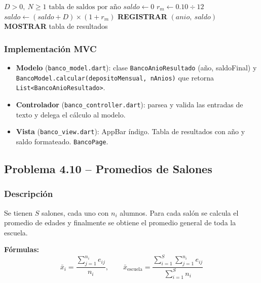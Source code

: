 \documentclass[12pt,a4paper]{article}
\begin{document}
\begin{algorithm}[H]
\caption{Saldo de Cuenta de Ahorros con Capitalización Compuesta Mensual}
\label{alg:banco}
\begin{algorithmic}[1]
  \Require $D > 0,\ N \geq 1$
  \Ensure $\text{tabla de saldos por año}$
  \State $saldo \leftarrow 0$
  \State $r_m \leftarrow 0.10 \div 12$
      \State $saldo \leftarrow (saldo + D) \times (1 + r_m)$
    \EndFor
    \State \textbf{REGISTRAR} $(anio,\ saldo)$
  \EndFor
  \State \textbf{MOSTRAR} tabla de resultados
\end{algorithmic}
\end{algorithm}

\subsubsection{Implementación MVC}

\begin{itemize}
  \item \textbf{Modelo} (\texttt{banco\_model.dart}): clase \texttt{BancoAnioResultado} (año, saldoFinal) y \texttt{BancoModel\allowbreak.calcular\allowbreak(depositoMensual, nAnios)} que retorna \texttt{List<\allowbreak{}BancoAnioResultado>}.
  \item \textbf{Controlador} (\texttt{banco\_controller.dart}): parsea y valida las entradas de texto y delega el cálculo al modelo.
  \item \textbf{Vista} (\texttt{banco\_view.dart}): AppBar índigo. Tabla de resultados con año y saldo formateado. \texttt{BancoPage}.
\end{itemize}

\subsection{Problema 4.10 -- Promedios de Salones}

\subsubsection{Descripción}

Se tienen $S$ salones, cada uno con $n_i$ alumnos. Para cada salón se calcula el promedio de edades y finalmente se obtiene el promedio general de toda la escuela.

\textbf{Fórmulas:}
\[
  \bar{x}_i = \frac{\displaystyle\sum_{j=1}^{n_i} e_{ij}}{n_i}, \qquad
  \bar{x}_{\text{escuela}} = \frac{\displaystyle\sum_{i=1}^{S}\sum_{j=1}^{n_i} e_{ij}}{\displaystyle\sum_{i=1}^{S} n_i}
\]
\end{document}
